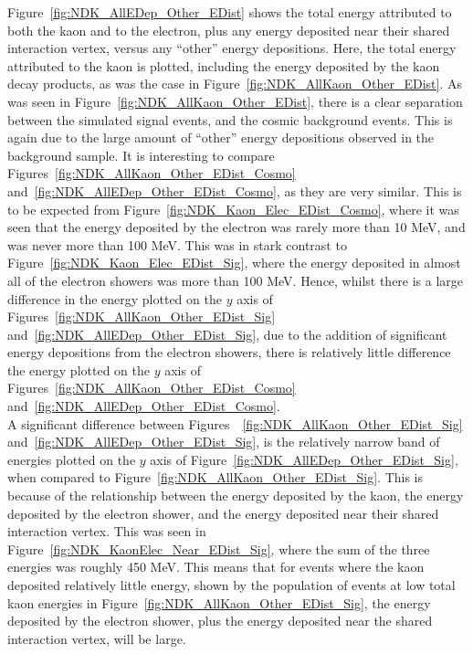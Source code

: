 Figure~\ref{fig:NDK_AllEDep_Other_EDist} shows the total energy attributed to both the kaon and to the electron, plus any energy deposited near their shared interaction vertex, versus any ``other'' energy depositions. Here, the total energy attributed to the kaon is plotted, including the energy deposited by the kaon decay products, as was the case in Figure~\ref{fig:NDK_AllKaon_Other_EDist}. As was seen in Figure~\ref{fig:NDK_AllKaon_Other_EDist}, there is a clear separation between the simulated signal events, and the cosmic background events. This is again due to the large amount of ``other'' energy depositions observed in the background sample. It is interesting to compare Figures~\ref{fig:NDK_AllKaon_Other_EDist_Cosmo} and~\ref{fig:NDK_AllEDep_Other_EDist_Cosmo}, as they are very similar. This is to be expected from Figure~\ref{fig:NDK_Kaon_Elec_EDist_Cosmo}, where it was seen that the energy deposited by the electron was rarely more than 10 MeV, and was never more than 100 MeV. This was in stark contrast to Figure~\ref{fig:NDK_Kaon_Elec_EDist_Sig}, where the energy deposited in almost all of the electron showers was more than 100 MeV. Hence, whilst there is a large difference in the energy plotted on the $y$ axis of Figures~\ref{fig:NDK_AllKaon_Other_EDist_Sig} and~\ref{fig:NDK_AllEDep_Other_EDist_Sig}, due to the addition of significant energy depositions from the electron showers, there is relatively little difference the energy plotted on the $y$ axis of Figures~\ref{fig:NDK_AllKaon_Other_EDist_Cosmo} and~\ref{fig:NDK_AllEDep_Other_EDist_Cosmo}. \\

A significant difference between Figures~~\ref{fig:NDK_AllKaon_Other_EDist_Sig} and~\ref{fig:NDK_AllEDep_Other_EDist_Sig}, is the relatively narrow band of energies plotted on the $y$ axis of Figure~\ref{fig:NDK_AllEDep_Other_EDist_Sig}, when compared to Figure~\ref{fig:NDK_AllKaon_Other_EDist_Sig}. This is because of the relationship between the energy deposited by the kaon, the energy deposited by the electron shower, and the energy deposited near their shared interaction vertex. This was seen in Figure~\ref{fig:NDK_KaonElec_Near_EDist_Sig}, where the sum of the three energies was roughly 450 MeV. This means that for events where the kaon deposited relatively little energy, shown by the population of events at low total kaon energies in Figure~\ref{fig:NDK_AllKaon_Other_EDist_Sig}, the energy deposited by the electron shower, plus the energy deposited near the shared interaction vertex, will be large. \\

